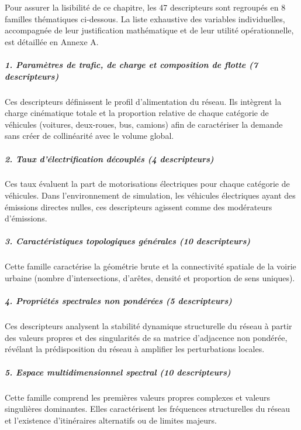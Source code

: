 \documentclass[10pt, a4paper]{article}
\begin{document}
Pour assurer la lisibilité de ce chapitre, les 47 descripteurs sont
regroupés en 8 familles thématiques ci-dessous. La liste exhaustive des
variables individuelles, accompagnée de leur justification mathématique
et de leur utilité opérationnelle, est détaillée en Annexe A.

\subparagraph{1. Paramètres de trafic, de charge et composition de
flotte (7
descripteurs)}\label{paramuxe8tres-de-trafic-de-charge-et-composition-de-flotte-7-descripteurs}

Ces descripteurs définissent le profil d'alimentation du réseau. Ils
intègrent la charge cinématique totale et la proportion relative de
chaque catégorie de véhicules (voitures, deux-roues, bus, camions) afin
de caractériser la demande sans créer de collinéarité avec le volume
global.

\subparagraph{2. Taux d'électrification découplés (4
descripteurs)}\label{taux-duxe9lectrification-duxe9coupluxe9s-4-descripteurs}

Ces taux évaluent la part de motorisations électriques pour chaque
catégorie de véhicules. Dans l'environnement de simulation, les
véhicules électriques ayant des émissions directes nulles, ces
descripteurs agissent comme des modérateurs d'émissions.

\subparagraph{3. Caractéristiques topologiques générales (10
descripteurs)}\label{caractuxe9ristiques-topologiques-guxe9nuxe9rales-10-descripteurs}

Cette famille caractérise la géométrie brute et la connectivité spatiale
de la voirie urbaine (nombre d'intersections, d'arêtes, densité et
proportion de sens uniques).

\subparagraph{4. Propriétés spectrales non pondérées (5
descripteurs)}\label{propriuxe9tuxe9s-spectrales-non-ponduxe9ruxe9es-5-descripteurs}

Ces descripteurs analysent la stabilité dynamique structurelle du réseau
à partir des valeurs propres et des singularités de sa matrice
d'adjacence non pondérée, révélant la prédisposition du réseau à
amplifier les perturbations locales.

\subparagraph{5. Espace multidimensionnel spectral (10
descripteurs)}\label{espace-multidimensionnel-spectral-10-descripteurs}

Cette famille comprend les premières valeurs propres complexes et
valeurs singulières dominantes. Elles caractérisent les fréquences
structurelles du réseau et l'existence d'itinéraires alternatifs ou de
limites majeurs.
\end{document}
